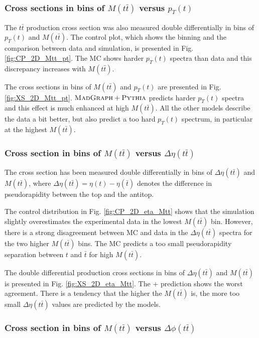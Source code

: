 
\subsubsection{Cross sections in bins of $M(t\bar{t})$ versus $p_{T}(t)$}

The $t\bar{t}$ production cross section was also measured double differentially in bins of $p_{T}(t)$ and $M(t\bar{t})$.
The control plot, which shows the binning and the comparison between data and simulation, is presented in Fig. \ref{fig:CP_2D_Mtt_pt}. 
The MC shows harder $p_{T}(t)$ spectra than data and this discrepancy increases with $M(t\bar{t})$.

The cross sections in bins of $M(t\bar{t})$ and $p_{T}(t)$ are presented in Fig. \ref{fig:XS_2D_Mtt_pt}. $\textsc{MadGraph}+\textsc{Pythia}$ predicts harder
$p_{T}(t)$ spectra and this effect is much enhanced at high $M(t\bar{t})$. All the other models describe the data a bit better, but 
also predict a too hard $p_{T}(t)$ spectrum, in particular at the highest $M(t\bar{t})$.

\subsubsection{Cross section in bins of $M(t\bar{t})$ versus $\Delta\eta(t\bar{t})$}

The cross section has been measured double differentially in bins of $\Delta\eta(t\bar{t})$ and $M(t\bar{t})$, where $\Delta\eta(t\bar{t}) = \eta(t) - \eta(\bar{t})$
denotes the difference in pseudorapidity between the top and the antitop.

The control distribution in Fig. \ref{fig:CP_2D_eta_Mtt} shows that the simulation slightly overestimates the experimental data in the lowest $M(t\bar{t})$
bin. However, there is a strong disagreement between MC and data in the $\Delta\eta(t\bar{t})$ spectra for the two higher $M(t\bar{t})$ bins. The MC predicts 
a too small pseudorapidity separation between $t$ and $\bar{t}$ for high $M(t\bar{t})$.

The double differential production cross sections in bins of $\Delta\eta(t\bar{t})$ and $M(t\bar{t})$ is presented in Fig. \ref{fig:XS_2D_eta_Mtt}. The \MG + \PYTHIA
prediction shows the worst agreement. There is a tendency that the higher the $M(t\bar{t})$ is, the more too small $\Delta\eta(t\bar{t})$ values are predicted by
the models.

\subsubsection{Cross section in bins of $M(t\bar{t})$ versus $\Delta\phi(t\bar{t})$}

